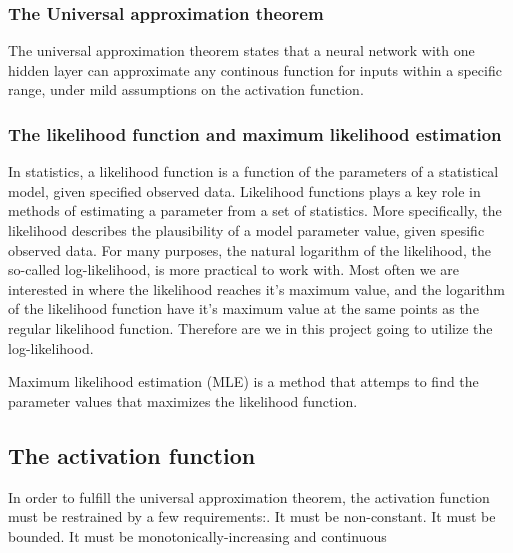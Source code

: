 \documentclass[a4paper,12pt]{article}
\begin{document}
\subsubsection{The Universal approximation theorem}
The universal approximation theorem states that a neural network with one hidden layer can approximate any continous function for inputs within a specific range, under mild assumptions on the activation function.

\subsubsection{The likelihood function and maximum likelihood estimation}
In statistics, a likelihood function is a function of the parameters of a statistical model, given specified observed data. Likelihood functions plays a key role in methods of estimating a parameter from a set of statistics. More specifically, the likelihood describes the plausibility of a model parameter value, given spesific observed data.\newline
For many purposes, the natural logarithm of the likelihood, the so-called log-likelihood, is more practical to work with. Most often we are interested in where the likelihood reaches it's maximum value, and the logarithm of the likelihood function have it's maximum value at the same points as the regular likelihood function. Therefore are we in this project going to utilize the log-likelihood.\newline

Maximum likelihood estimation (MLE) is a method that attemps to find the parameter values that maximizes the likelihood function.

\subsection{The activation function}
In order to fulfill the universal approximation theorem, the activation function must be restrained by a few requirements:. It must be non-constant. It must be bounded. It must be monotonically-increasing and continuous\newline
\end{document}
